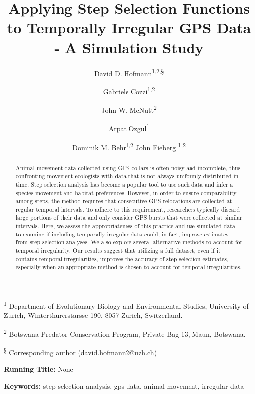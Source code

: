 \documentclass[abstract=on,10pt,a4paper,bibliography=totocnumbered]{article}
\title{Applying Step Selection Functions to Temporally Irregular GPS Data - A
Simulation Study}
\author{
  David D. Hofmann\textsuperscript{1,2,\S} \orcid{0000-0003-3477-4365} \and
  Gabriele Cozzi\textsuperscript{1,2} \orcid{0000-0002-1744-1940} \and
  John W. McNutt\textsuperscript{2} \and
  Arpat Ozgul\textsuperscript{1} \orcid{0000-0001-7477-2642} \and
  Dominik M. Behr\textsuperscript{1,2} \orcid{0000-0001-7378-8538}
  John Fieberg \textsuperscript{1,2} \orcid{0000-0002-3180-7021}
}
\begin{document}



\maketitle

\begin{flushleft}

\vspace{0.5cm}

\textsuperscript{1} Department of Evolutionary Biology and Environmental
Studies, University of Zurich, Winterthurerstarsse 190, 8057 Zurich,
Switzerland.

\textsuperscript{2} Botswana Predator Conservation Program, Private Bag 13,
Maun, Botswana.

\textsuperscript{\S} Corresponding author (david.hofmann2@uzh.ch)

\vspace{4cm}

\textbf{Running Title:} None

\vspace{0.5cm}

\textbf{Keywords:} step selection analysis, gps data, animal movement, irregular
data

\end{flushleft}

\newpage
\begin{abstract}
Animal movement data collected using GPS collars is often noisy and incomplete,
thus confronting movement ecologists with data that is not always uniformly
distributed in time. Step selection analysis has become a popular tool to use
such data and infer a species movement and habitat preferences. However, in
order to ensure comparability among steps, the method requires that consecutive
GPS relocations are collected at regular temporal intervals. To adhere to this
requirement, researchers typically discard large portions of their data and only
consider GPS bursts that were collected at similar intervals. Here, we assess
the appropriateness of this practice and use simulated data to examine if
including temporally irregular data could, in fact, improve estimates from
step-selection analyses. We also explore several alternative methods to account
for temporal irregularity. Our results suggest that utilizing a full dataset,
even if it contains temporal irregularities, improves the accuracy of step
selection estimates, especially when an appropriate method is chosen to account
for temporal irregularities.
\end{abstract}
\end{document}
